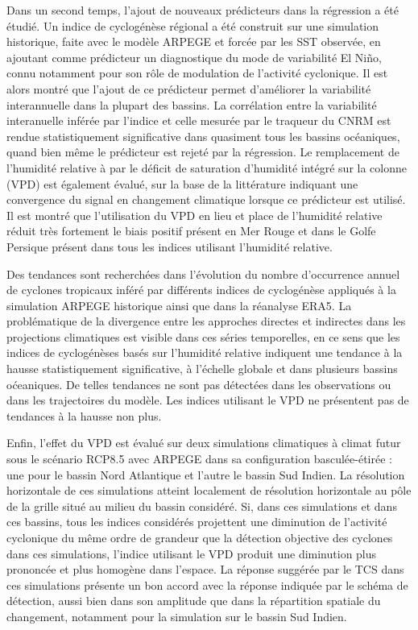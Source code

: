 \documentclass[../main.tex]{subfiles}
\begin{document}
Dans un second temps, l'ajout de nouveaux prédicteurs dans la régression a été étudié. Un indice de cyclogénèse régional a été construit sur une simulation
historique, faite avec le modèle ARPEGE et forcée par les SST observée, en ajoutant comme prédicteur un diagnostique du mode de variabilité El Niño, connu
notamment pour son rôle de modulation de l'activité cyclonique. Il est alors montré que l'ajout de ce prédicteur permet d'améliorer la variabilité interannuelle
dans la plupart des bassins. La corrélation entre la variabilité interanuelle inférée par l'indice et celle mesurée par le traqueur du CNRM est rendue
statistiquement significative dans quasiment tous les bassins océaniques, quand bien même le prédicteur est rejeté par la régression. Le remplacement de
l'humidité relative à  par le déficit de saturation d'humidité intégré sur la colonne (VPD) est également évalué, sur la base de la
littérature indiquant une convergence du signal en changement climatique lorsque ce prédicteur est utilisé. Il est montré que l'utilisation du VPD en lieu et
place de l'humidité relative réduit très fortement le biais positif présent en Mer Rouge et dans le Golfe Persique présent dans tous les indices utilisant
l'humidité relative.

Des tendances sont recherchées dans l'évolution du nombre d'occurrence annuel de cyclones tropicaux inféré par différents indices de cyclogénèse appliqués à la
simulation ARPEGE historique ainsi que dans la réanalyse ERA5. La problématique de la divergence entre les approches directes et indirectes dans les projections
climatiques est visible dans ces séries temporelles, en ce sens que les indices de cyclogénèses basés sur l'humidité relative indiquent une tendance à la hausse
statistiquement significative, à l'échelle globale et dans plusieurs bassins oćeaniques. De telles tendances ne sont pas détectées dans les observations ou
dans les trajectoires du modèle. Les indices utilisant le VPD ne présentent pas de tendances à la hausse non plus.

Enfin, l'effet du VPD est évalué sur deux simulations climatiques à climat futur sous le scénario RCP8.5 avec ARPEGE dans sa configuration basculée-étirée : une pour
le bassin Nord Atlantique et l'autre le bassin Sud Indien. La résolution horizontale de ces simulations atteint localement  de résolution horizontale au pôle de la grille situé au milieu du bassin considéré. Si, dans ces simulations et dans ces bassins, tous les
indices considérés projettent une diminution de l'activité cyclonique du même ordre de grandeur que la détection objective des cyclones dans ces simulations,
l'indice utilisant le VPD produit une diminution plus prononcée et plus homogène dans l'espace. La réponse suggérée par le TCS dans ces simulations présente un
bon accord avec la réponse indiquée par le schéma de détection, aussi bien dans son amplitude que dans la répartition spatiale du changement, notamment pour la
simulation sur le bassin Sud Indien.
\end{document}
